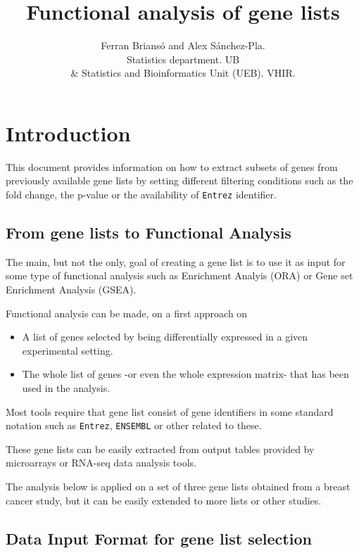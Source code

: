 \documentclass{article}\usepackage[]{graphicx}\usepackage[]{color}
\title{Functional analysis of gene lists}
\author{Ferran Brians\'o and Alex S\'anchez-Pla. \\ Statistics department. UB \\ \& Statistics and Bioinformatics Unit (UEB). VHIR.}
\begin{document}
\maketitle
\tableofcontents









\section{Introduction}

This document provides information on how to extract subsets of genes from previously available gene lists by setting different filtering conditions such as the fold change, the p-value or the availability of \texttt{Entrez} identifier.

\subsection{From gene lists to Functional Analysis}

The main, but not the only, goal of creating a gene list is to use it as input for some type of functional analysis such as Enrichment Analyis (ORA) or Gene set Enrichment Analysis (GSEA).

Functional analysis can be made, on a first approach on
\begin{itemize}
\item A list of genes selected by being differentially expressed in a given experimental setting.
\item The whole list of genes -or even the whole expression matrix- that has been used in the analysis.
\end{itemize}

Most tools require that gene list consist of gene identifiers in some standard notation such as \texttt{Entrez}, \texttt{ENSEMBL} or other related to these.

These gene lists can be easily extracted from output tables provided by microarrays or RNA-seq data analysis tools.

The analysis below is applied on a set of three gene lists obtained from a breast cancer study, but it can be easily extended to more lists or other studies.

\subsection{Data Input Format for gene list selection}
\end{document}

